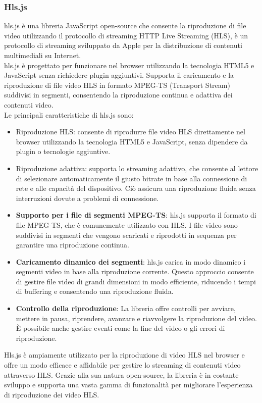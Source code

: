 \subsubsection{Hls.js}
hls.js è una libreria JavaScript open-source che consente la riproduzione di file video utilizzando il protocollo di streaming HTTP Live Streaming (HLS), è un protocollo di streaming sviluppato da Apple per la distribuzione di contenuti multimediali su Internet.\\
hls.js è progettato per funzionare nel browser utilizzando la tecnologia HTML5 e JavaScript senza richiedere plugin aggiuntivi. Supporta il caricamento e la riproduzione di file video HLS in formato MPEG-TS (Transport Stream) suddivisi in segmenti, consentendo la riproduzione continua e adattiva dei contenuti video.\\
Le principali caratteristiche di hls.js sono:
\begin{itemize}
    \item{Riproduzione HLS}: consente di riprodurre file video HLS direttamente nel browser utilizzando la tecnologia HTML5 e JavaScript, senza dipendere da plugin o tecnologie aggiuntive.
    \item{Riproduzione adattiva}: supporta lo streaming adattivo, che consente al lettore di selezionare automaticamente il giusto bitrate in base alla connessione di rete e alle capacità del dispositivo. Ciò assicura una riproduzione fluida senza interruzioni dovute a problemi di connessione.
    \item \textbf{Supporto per i file di segmenti MPEG-TS}: hls.js supporta il formato di file MPEG-TS, che è comunemente utilizzato con HLS. I file video sono suddivisi in segmenti che vengono scaricati e riprodotti in sequenza per garantire una riproduzione continua.
    \item \textbf{Caricamento dinamico dei segmenti}: hls.js carica in modo dinamico i segmenti video in base alla riproduzione corrente. Questo approccio consente di gestire file video di grandi dimensioni in modo efficiente, riducendo i tempi di buffering e consentendo una riproduzione fluida.
    \item \textbf{Controllo della riproduzione}: La libreria offre controlli per avviare, mettere in pausa, riprendere, avanzare e riavvolgere la riproduzione del video. È possibile anche gestire eventi come la fine del video o gli errori di riproduzione.
\end{itemize}
Hls.js è ampiamente utilizzato per la riproduzione di video HLS nel browser e offre un modo efficace e affidabile per gestire lo streaming di contenuti video attraverso HLS. Grazie alla sua natura open-source, la libreria è in costante sviluppo e supporta una vasta gamma di funzionalità per migliorare l'esperienza di riproduzione dei video HLS.
